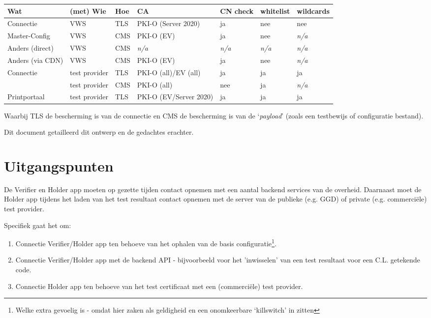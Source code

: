 \documentclass[11.0pt,twoside,openright]{report}
\begin{document}
\begin{tabular}{|l|l|l|l|l|l|l|}
\hline
Wat						& (met) Wie					& Hoe	& CA						& CN check & whitelist & wildcards  \\
\hline
\hline
Connectie				& VWS						& TLS 	& PKI-O (Server 2020)	& ja			& nee		& nee \\
Master-Config			& VWS						& CMS 	& PKI-O (EV)  		& ja			& nee		& \emph{n/a} \\
Anders (direct)			& VWS						& CMS	& \emph{n/a}		  		& \emph{n/a}	& \emph{n/a}& \emph{n/a} \\
Anders (via CDN)		& VWS						& CMS	& PKI-O (EV)  		& ja			& nee 		& \emph{n/a} \\
Connectie				& test provider 				& TLS 	& PKI-O (all)/EV (all) 	& ja 			& ja 		& ja \\
						& test provider 				& CMS 	& PKI-O (all) 			& nee 			& ja 		& \emph{n/a} \\
Printportaal			& test provider 				& TLS 	& PKI-O (EV/Server 2020) & ja 			& ja 		& ja \\
\hline
\end{tabular}

Waarbij TLS de bescherming is van de connectie en CMS de bescherming is van de `\emph{payload}' (zoals een testbewijs of configuratie bestand).

Dit document getailleerd dit ontwerp en de gedachtes erachter.

\pagebreak
\section*{Uitgangspunten}

De Verifier en Holder app moeten op gezette tijden contact opnemen met een aantal backend services van de overheid. Daarnaast moet de Holder app tijdens het laden van het test resultaat contact opnemen met de server van de publieke (e.g. GGD) of private (e.g. commerciële) test provider. 

Specifiek gaat het om:

\begin{enumerate}
\item	Connectie Verifier/Holder app ten behoeve van het ophalen van de basis configuratie\footnote{Welke extra gevoelig is - omdat hier zaken als geldigheid en een onomkeerbare `killswitch' in zitten}.
\item	Connectie Verifier/Holder app met de backend API - bijvoorbeeld voor het 'inwisselen' van een test resultaat voor een C.L. getekende code.
\item 	Connectie Holder app ten behoeve van het test certificaat met een (commerciële) test provider. 
\end{enumerate}
\end{document}
